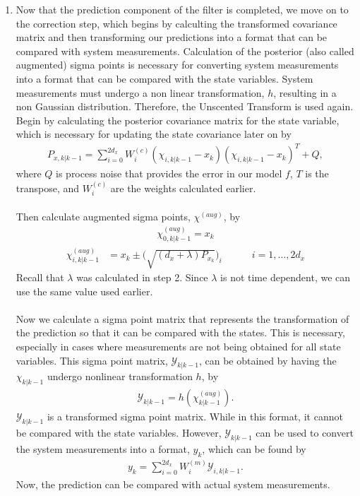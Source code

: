 \begin{enumerate}
        
                \item Now that the prediction component of the filter is completed, we move on to the correction step, which begins by calculting the transformed covariance matrix and then transforming our predictions into a format that can be compared with system measurements. Calculation of the posterior (also called augmented) sigma points is necessary for converting system measurements into a format that can be compared with the state variables. System measurements must undergo a non linear transformation, $h$, resulting in a non Gaussian distribution. Therefore, the Unscented Transform is used again.
                Begin by calculating the posterior covariance matrix for the state variable, which is necessary for updating the state covariance later on by
        \begin{align*}
        P_{x, k | k-1} = \sum^{2d_x}_{i = 0} W_i^{(c)} (\chi_{i, k | k - 1} -   x_{k} )(\chi_{i, k | k - 1} - x_{k} )^T + Q,
        \end{align*} 
        where $Q$ is process noise that provides the error in our model $f$, $T$ is the transpose, and $W_i^{(c)}$ are the weights calculated earlier. \\ \\        
                
\noindent Then calculate augmented sigma points, $\chi^{(aug)}$, by
      \begin{align*}
        \chi^{(aug)}_{0, k|k-1} =  x_{k}
        \end{align*}
         \begin{align*}
        \chi^{(aug)}_{ i,k |k-1} &= x_k  \pm \bigg(\sqrt{(d_{x}+\lambda)P_{x_k}} \bigg)_{i} \quad \quad \quad  i=1,\dots,2d_{x}
        \end{align*}
        Recall that $\lambda$ was calculated in step 2. Since $\lambda$ is not time dependent, we can use the same value used earlier. \\ \\
        Now we calculate a sigma point matrix that represents the transformation of the prediction so that it can be compared with the states. This is necessary, especially in cases where measurements are not being obtained for all state variables. This sigma point matrix, $\mathcal{Y}_{k|k-1}$, can be obtained by having the $\chi_{k|k-1}$ undergo nonlinear transformation $h$, by
         \begin{align*}
       \mathcal{Y}_{k|k-1} = h(\chi^{(aug)}_{k|k-1}).
       \end{align*}
       $\mathcal{Y}_{k|k-1} $ is a transformed sigma point matrix. While in this format, it cannot be compared with the state variables. However, $\mathcal{Y}_{k|k-1}$ can be used to convert the system measurements into a format, $y_{k} $, which can be found by 
       \begin{align*}
       y_{k} = \sum^{2d_x}_{i = 0} W_i^{(m)}  \mathcal{Y}_{i, k | k - 1}.
       \end{align*}
       Now, the prediction can be compared with actual system measurements.
       

\end{enumerate}
